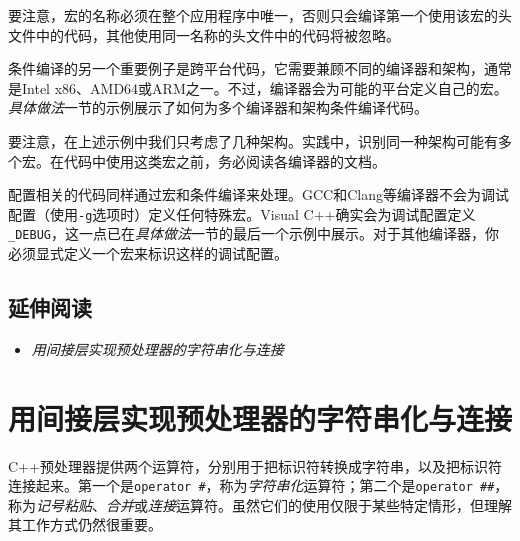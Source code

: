 
\begin{myNote}
要注意，宏的名称必须在整个应用程序中唯一，否则只会编译第一个使用该宏的头文件中的代码，其他使用同一名称的头文件中的代码将被忽略。
\end{myNote}



条件编译的另一个重要例子是跨平台代码，它需要兼顾不同的编译器和架构，通常是Intel x86、AMD64或ARM之一。不过，编译器会为可能的平台定义自己的宏。\textit{具体做法}一节的示例展示了如何为多个编译器和架构条件编译代码。



\begin{myNote}
要注意，在上述示例中我们只考虑了几种架构。实践中，识别同一种架构可能有多个宏。在代码中使用这类宏之前，务必阅读各编译器的文档。
\end{myNote}



配置相关的代码同样通过宏和条件编译来处理。GCC和Clang等编译器不会为调试配置（使用\texttt{-\allowbreak{}g}选项时）定义任何特殊宏。Visual C++确实会为调试配置定义\texttt{\_\allowbreak{}DEBUG}，这一点已在\textit{具体做法}一节的最后一个示例中展示。对于其他编译器，你必须显式定义一个宏来标识这样的调试配置。



\subsection{延伸阅读}



\begin{itemize}
\item \textit{用间接层实现预处理器的字符串化与连接}

\end{itemize}



\section{用间接层实现预处理器的字符串化与连接}



C++预处理器提供两个运算符，分别用于把标识符转换成字符串，以及把标识符连接起来。第一个是\texttt{operator \#}，称为\textit{字符串化}运算符；第二个是\texttt{operator \#\#}，称为\textit{记号粘贴}、\textit{合并}或\textit{连接}运算符。虽然它们的使用仅限于某些特定情形，但理解其工作方式仍然很重要。


